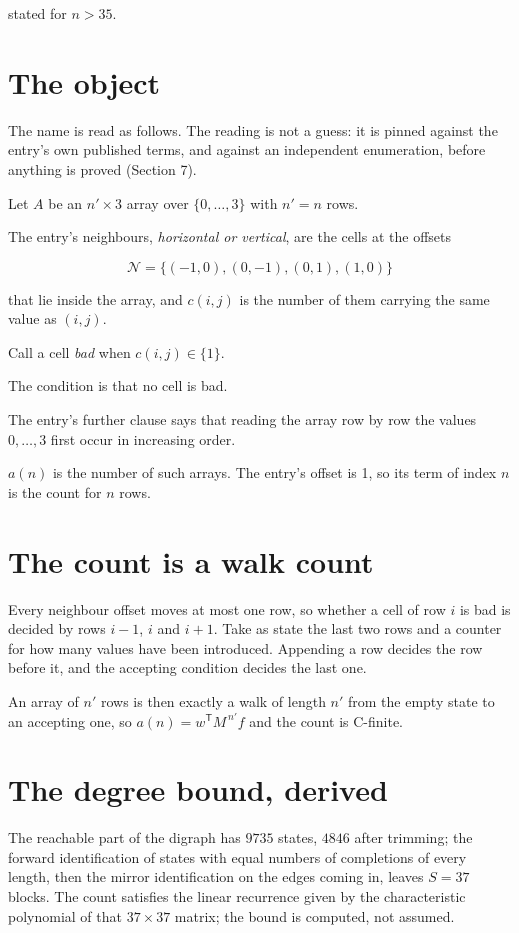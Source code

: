 \documentclass[11pt]{article}
\theoremstyle{definition}
\begin{document}
stated for $n > 35$.

\section{The object}

The name is read as follows. The reading is not a guess: it is pinned against the entry's own published terms, and against an independent enumeration, before anything is proved (Section 7).

Let $A$ be an $n' \times 3$ array over $\{0,\dots,3\}$ with $n' = n$ rows.

The entry's neighbours, {\itshape horizontal or vertical}, are the cells at the offsets

\[\mathcal{N} = \{(-1,0), (0,-1), (0,1), (1,0)\}\]

that lie inside the array, and $c(i,j)$ is the number of them carrying the same value as $(i,j)$.

Call a cell {\itshape bad} when $c(i,j) \in \{1\}$.

The condition is that no cell is bad.

The entry's further clause says that reading the array row by row the values $0,\dots,3$ first occur in increasing order.

$a(n)$ is the number of such arrays. The entry's offset is 1, so its term of index $n$ is the count for $n$ rows.

\section{The count is a walk count}

Every neighbour offset moves at most one row, so whether a cell of row $i$ is bad is decided by rows $i-1$, $i$ and $i+1$. Take as state the last two rows and a counter for how many values have been introduced. Appending a row decides the row before it, and the accepting condition decides the last one.

An array of $n'$ rows is then exactly a walk of length $n'$ from the empty state to an accepting one, so $a(n) = w^{\mathsf T}M^{\,n'}f$ and the count is C-finite.

\section{The degree bound, derived}

The reachable part of the digraph has $9735$ states, $4846$ after trimming; the forward identification of states with equal numbers of completions of every length, then the mirror identification on the edges coming in, leaves $S = 37$ blocks. The count satisfies the linear recurrence given by the characteristic polynomial of that $37\times37$ matrix; the bound is computed, not assumed.
\end{document}
